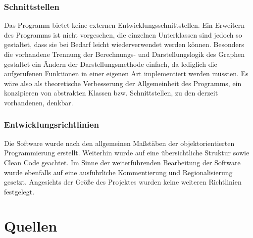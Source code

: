 \documentclass[a4paper]{article}
\begin{document}
    \subsubsection{Schnittstellen}

    Das Programm bietet keine externen Entwicklungsschnittstellen.
    Ein Erweitern des Programms ist nicht vorgesehen, die einzelnen Unterklassen sind jedoch so gestaltet, dass sie bei Bedarf leicht wiederverwendet werden können.
    Besonders die vorhandene Trennung der Berechnungs- und Darstellungslogik des Graphen gestaltet ein Ändern der Darstellungsmethode einfach, da lediglich die aufgerufenen Funktionen in einer eigenen Art implementiert werden müssten.
    Es wäre also als theoretische Verbesserung der Allgemeinheit des Programms, ein konzipieren von abstrakten Klassen bzw. Schnittstellen, zu den derzeit vorhandenen, denkbar.

    \subsubsection{Entwicklungsrichtlinien}
    
    Die Software wurde nach den allgemeinen Maßstäben der objektorientierten Programmierung erstellt.
    Weiterhin wurde auf eine übersichtliche Struktur sowie Clean Code geachtet.
    Im Sinne der weiterführenden Bearbeitung der Software wurde ebenfalls auf eine ausführliche Kommentierung und Regionalisierung gesetzt.
    Angesichts der Größe des Projektes wurden keine weiteren Richtlinien festgelegt.

\newpage
{}
\section{Quellen}
\end{document}
